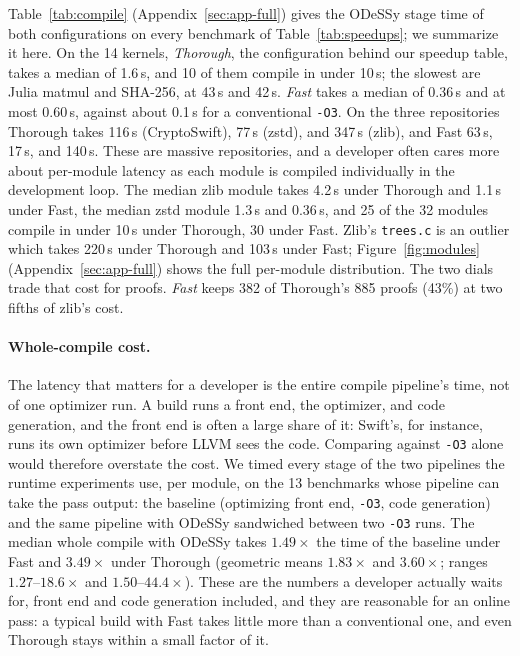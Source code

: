 \documentclass[acmsmall,screen,nonacm]{acmart}
\newcommand{\odessy}{ODeSSy}
\newcommand{\tool}{\odessy}
\newcommand{\pct}[1]{#1\%}
\begin{document}
Table~\ref{tab:compile} (Appendix~\ref{sec:app-full}) gives the \tool{}
stage time of both configurations on every benchmark of
Table~\ref{tab:speedups}; we summarize it here. On the 14 kernels,
\emph{Thorough}, the configuration behind our speedup table, takes a
median of 1.6\,s, and 10 of them compile in under 10\,s; the slowest are
Julia matmul and SHA-256, at 43\,s and 42\,s. \emph{Fast} takes a median of 0.36\,s and at
most 0.60\,s, against about 0.1\,s for a conventional \texttt{-O3}. On
the three repositories Thorough takes 116\,s (CryptoSwift), 77\,s
(zstd), and 347\,s (zlib), and Fast 63\,s, 17\,s, and 140\,s. These are massive repositories, and a developer often cares more about per-module latency as each module is compiled individually in the development loop. The median zlib module takes 4.2\,s
under Thorough and 1.1\,s under Fast, the median zstd module 1.3\,s
and 0.36\,s, and 25 of the 32 modules compile in under 10\,s under
Thorough, 30 under Fast. Zlib's \texttt{trees.c} is an outlier which takes
220\,s under Thorough and 103\,s under Fast; Figure~\ref{fig:modules}
(Appendix~\ref{sec:app-full}) shows the full per-module distribution.
The two dials trade that cost for proofs. \emph{Fast} keeps 382 of
Thorough's 885 proofs (\pct{43}) at two fifths of zlib's cost. 

\paragraph{Whole-compile cost.}
The latency that matters for a developer is the entire compile pipeline's time, not of
one optimizer run. A build runs a front end, the optimizer, and code
generation, and the front end is often a large share of it: Swift's, for
instance, runs its own optimizer before LLVM sees the code. Comparing
against \texttt{-O3} alone would therefore overstate the cost. We timed
every stage of the two pipelines the runtime experiments use, per module,
on the 13 benchmarks whose pipeline can take the pass output: the baseline (optimizing front end, \texttt{-O3}, code
generation) and the same pipeline with \tool{} sandwiched between two 
\texttt{-O3} runs. The median whole compile with \tool{} takes $1.49\times$ the
time of the baseline under Fast and $3.49\times$ under Thorough
(geometric means $1.83\times$ and $3.60\times$; ranges
$1.27$--$18.6\times$ and $1.50$--$44.4\times$). These are the numbers a
developer actually waits for, front end and code generation included,
and they are reasonable for an online pass: a typical build with Fast takes
little more than a conventional one, and even Thorough stays within a
small factor of it. 
\end{document}
